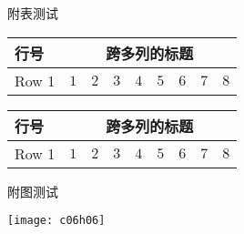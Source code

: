 {\begin{appfig}[!htb]
		\label{appfig:deltaall}
	\end{appfig}
	

附表测试

\begin{apptab}[!htbp]
    \label{apptab:1}
    \centering
    \footnotesize%
    \setlength{\tabcolsep}{4pt}%
    \renewcommand{\arraystretch}{1.2}%
    \begin{tabular}{lcccccccc}
        \hline
        行号 & \multicolumn{8}{c}{跨多列的标题}\\
        \hline
        Row 1 & $1$ & $2$ & $3$ & $4$ & $5$ & $6$ & $7$ & $8$\\
        \hline
    \end{tabular}
\end{apptab}


\begin{apptab}[!htbp]
    \label{apptab:2}
    \centering
    \footnotesize%
    \setlength{\tabcolsep}{4pt}%
    \renewcommand{\arraystretch}{1.2}%
    \begin{tabular}{lcccccccc}
        \hline
        行号 & \multicolumn{8}{c}{跨多列的标题}\\
        \hline
        Row 1 & $1$ & $2$ & $3$ & $4$ & $5$ & $6$ & $7$ & $8$\\
        \hline
    \end{tabular}
\end{apptab}

附图测试

\begin{appfig}[!htbp]
    \centering
    \texttt{[image: c06h06]}
    
    \label{appfig:1}
\end{appfig}

    
}
